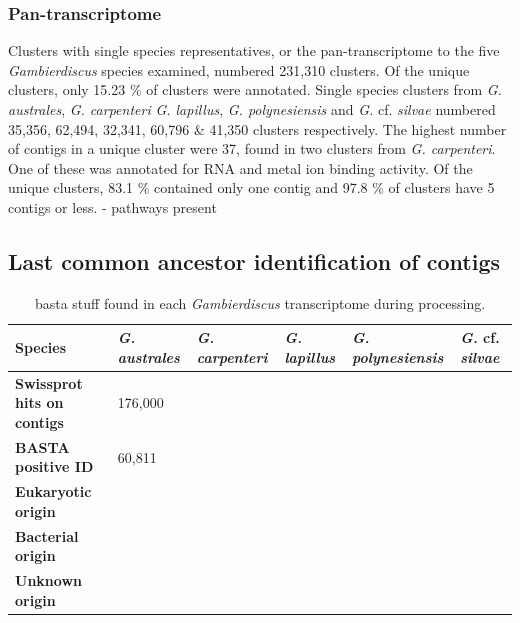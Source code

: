 \documentclass[12pt]{article}
\begin{document}
\subsubsection*{Pan-transcriptome}
Clusters with single species representatives, or the pan-transcriptome to the five \textit{Gambierdiscus} species examined, numbered 231,310 clusters. 
Of the unique clusters, only 15.23 \% of clusters were annotated. 
Single species clusters from \emph{G. australes}, \textit{G. carpenteri} \textit{G. lapillus}, \textit{G. polynesiensis} and \textit{G.} cf. \textit{silvae} numbered 35,356, 62,494, 32,341, 60,796 \& 41,350 clusters respectively. 
The highest number of contigs in a unique cluster were 37, found in two clusters from \textit{G. carpenteri}. 
One of these was annotated for RNA and metal ion binding activity. 
Of the unique clusters, 83.1 \% contained only one contig and 97.8 \% of clusters have 5 contigs or less. 
- pathways present\\

\subsection*{Last common ancestor identification of contigs}

\begin{table}
\caption{basta stuff found in each \emph{Gambierdiscus} transcriptome during processing.}
\label{tbl:bastaTable}
\begin{tabular}{ | p{3cm} | p{2cm} | p{2.5cm} | p{2.5cm} | p{2cm} | p{2cm}|}
\hline
\textbf{Species}& \textit{G. australes}& \emph{G. carpenteri}&\emph{G. lapillus}&\emph{G. polynesiensis}&\emph{G.} cf. \emph{silvae}\\
\hline
\textbf{Swissprot hits on contigs}&176,000&&&&\\ %
\hline
\textbf{BASTA positive ID}&60,811&&&&\\ %
\hline
\textbf{Eukaryotic origin} &&&&&\\
\hline
\textbf{Bacterial origin}&&&&&\\
\hline
\textbf{Unknown origin}&&&&&\\
\hline
\end{tabular}
\end{table}
\FloatBarrier
\newpage
\end{document}
